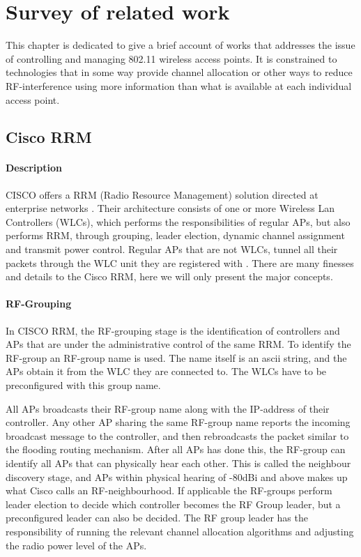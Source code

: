 \chapter{Survey of related work}
This chapter is dedicated to give a brief account of works that addresses the issue of controlling and managing 802.11 wireless access points. It is constrained
to technologies that in some way provide channel allocation or other ways to reduce RF-interference using more information than what is available at each individual access point. 

\section{Cisco RRM}
\subsubsection{Description}
CISCO offers a RRM (Radio Resource Management) solution directed at enterprise networks \cite{ciscoRRM}.
Their architecture consists of one or more Wireless Lan Controllers (WLCs), which performs the responsibilities of regular APs, 
but also performs RRM, through grouping, leader election, dynamic channel assignment and transmit power control. Regular APs that 
are not WLCs, tunnel all their packets through the WLC unit they are registered with \cite{cisco_2009}. There are many finesses and details to the Cisco RRM, here we will only present the
major concepts.

\subsubsection{RF-Grouping}
In CISCO RRM, the RF-grouping stage is the identification of controllers and APs that are under the administrative control of the same RRM. 
To identify the RF-group an RF-group name is used. The name itself is an ascii string, and the APs obtain it from the WLC they are connected to. The WLCs have to be preconfigured with this group name.

All APs broadcasts their RF-group name along with the IP-address of their controller.
Any other AP sharing the same RF-group name reports the incoming broadcast message to the controller, and then rebroadcasts the packet similar to the flooding routing mechanism.
After all APs has done this, the RF-group can identify all APs that can physically hear each other.
This is called the neighbour discovery stage, and APs within physical hearing of -80dBi and above makes up what Cisco calls an RF-neighbourhood.
If applicable the RF-groups perform leader election to decide which controller becomes the RF Group leader, but a preconfigured leader can also be decided.
The RF group leader has the responsibility of running the relevant channel allocation algorithms and adjusting the radio power level of the APs. 

